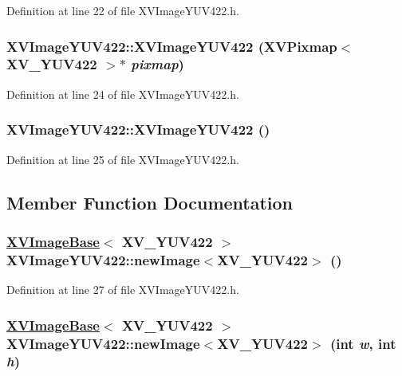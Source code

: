 Definition at line 22 of file XVImage\-YUV422.h.\label{XVImageYUV422_a4}
\hypertarget{class_XVImageYUV422_a4}{
\subsubsection[XVImageYUV422]{\setlength{\rightskip}{0pt plus 5cm}XVImage\-YUV422::XVImage\-YUV422 (XVPixmap$<$ XV\_\-YUV422 $>$$\ast$ {\em pixmap})}}




Definition at line 24 of file XVImage\-YUV422.h.\label{XVImageYUV422_a5}
\hypertarget{class_XVImageYUV422_a5}{
\subsubsection[XVImageYUV422]{\setlength{\rightskip}{0pt plus 5cm}XVImage\-YUV422::XVImage\-YUV422 ()}}




Definition at line 25 of file XVImage\-YUV422.h.

\subsection{Member Function Documentation}
\label{XVImageYUV422_a6}
\hypertarget{class_XVImageYUV422_a6}{
\subsubsection[newImage]{\setlength{\rightskip}{0pt plus 5cm}\hyperlink{class_XVImageBase}{XVImage\-Base}$<$ XV\_\-YUV422 $>$ XVImage\-YUV422::new\-Image$<$XV\_\-YUV422$>$ ()}}




Definition at line 27 of file XVImage\-YUV422.h.\label{XVImageYUV422_a7}
\hypertarget{class_XVImageYUV422_a7}{
\subsubsection[newImage]{\setlength{\rightskip}{0pt plus 5cm}\hyperlink{class_XVImageBase}{XVImage\-Base}$<$ XV\_\-YUV422 $>$ XVImage\-YUV422::new\-Image$<$XV\_\-YUV422$>$ (int {\em w}, int {\em h})}}




